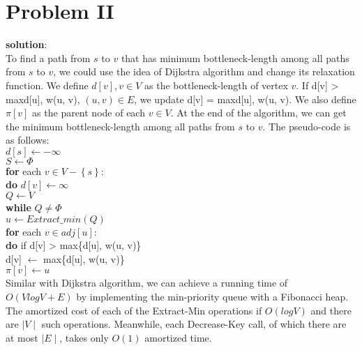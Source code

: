 \section{Problem II}
\textbf{solution}:\\
To find a path from $s$ to $v$ that has minimum bottleneck-length among all paths from $s$ to $v$, we could use the idea of Dijkstra algorithm and change its relaxation function. We define $d[v], v \in V$ as the bottleneck-length of vertex $v$. If d[v] > max{d[u], w(u, v)}, $(u, v) \in E$, we update d[v] = max{d[u], w(u, v)}. We also define $\pi[v]$ as the parent node of each $v \in V$. At the end of the algorithm, we can get the minimum bottleneck-length among all paths from $s$ to $v$. The pseudo-code is as follows:\\

$d[s] \gets -\infty
$\\
$S \gets \Phi$\\
\textbf{for} each $v \in V - \left\{ s \right\}$:\\
 \hspace*{0.6cm} \textbf{do} $d[v] \gets \infty$\\
 $Q \gets V$\\
 \textbf{while} $Q \neq \Phi$\\
 \hspace*{0.6cm} $u \gets Extract\_min(Q)$\\
 \hspace*{0.6cm} \textbf{for} each $v \in adj[u]$:\\
 \hspace*{0.6cm} \hspace*{0.6cm} \textbf{do} if d[v] > max\{d[u], w(u, v)\}\\
\hspace*{0.6cm} \hspace*{0.6cm} \hspace*{0.6cm} d[v] $\gets$ max\{d[u], w(u, v)\}\\
\hspace*{0.6cm} \hspace*{0.6cm} \hspace*{0.6cm} $\pi[v] \gets u$\\

Similar with Dijkstra algorithm, we can achieve a running time of $O(VlogV + E)$ by implementing the min-priority queue with a Fibonacci heap. The amortized cost of each of the Extract-Min operations if $O(logV)$ and there are $\mid V \mid$ such operations. Meanwhile, each Decrease-Key call, of which there are at most $\mid E \mid$, takes only $O(1)$ amortized time. 